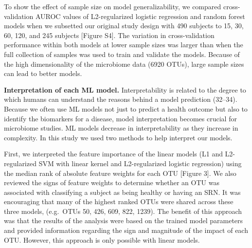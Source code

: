 \documentclass[11pt,]{article}
\begin{document}
To show the effect of sample size on model generalizability, we compared
cross-validation AUROC values of L2-regularized logistic regression and
random forest models when we subsetted our original study design with
490 subjects to 15, 30, 60, 120, and 245 subjects {[}Figure S4{]}. The
variation in cross-validation performance within both models at lower
sample sizes was larger than when the full collection of samples was
used to train and validate the models. Because of the high
dimensionality of the microbiome data (6920 OTUs), large sample sizes
can lead to better models.

\textbf{Interpretation of each ML model.} Interpretability is related to
the degree to which humans can understand the reasons behind a model
prediction (32--34). Because we often use ML models not just to predict
a health outcome but also to identify the biomarkers for a disease,
model interpretation becomes crucial for microbiome studies. ML models
decrease in interpretability as they increase in complexity. In this
study we used two methods to help interpret our models.

First, we interpreted the feature importance of the linear models (L1
and L2-regularized SVM with linear kernel and L2-regularized logistic
regression) using the median rank of absolute feature weights for each
OTU {[}Figure 3{]}. We also reviewed the signs of feature weights to
determine whether an OTU was associated with classifying a subject as
being healthy or having an SRN. It was encouraging that many of the
highest ranked OTUs were shared across these three models, (e.g.~OTUs
50, 426, 609, 822, 1239). The benefit of this approach was that the
results of the analysis were based on the trained model parameters and
provided information regarding the sign and magnitude of the impact of
each OTU. However, this approach is only possible with linear models.
\end{document}
